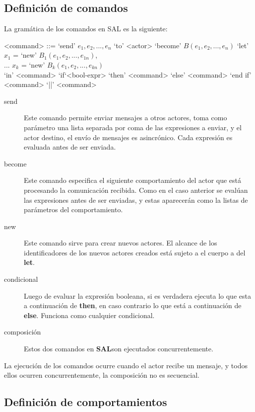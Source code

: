 \documentclass[fleqn]{article}
\newcommand{\SAL}{\textbf{SAL}}
\begin{document}
\subsection{Definición de comandos}
La gramática de los comandos en SAL es la siguiente:

\begin{grammar}
  <command> ::= `send' $e_1, e_2, ..., e_n$ `to' <actor>  
  \alt `become' $B(e_1, e_2, ..., e_n)$
  \alt `let' $x_1$ = `new' $B_1(e_1, e_2, ..., e_{1n})$, \\
   ... $x_k$ = `new' $B_k(e_1, e_2, ..., e_{kn})$       \\
  `in' <command> 
  \alt `if`<bool-expr> `then' <command> `else' <command> `end if'
  \alt <command> `||' <command>
\end{grammar}

\begin{description}
\item [send]  Este comando permite enviar mensajes a otros actores, toma como
  parámetro una lista separada por coma de las expresiones a enviar, y el actor
  destino, el envío de mensajes es asincrónico. Cada expresión es evaluada antes
  de ser enviada.
\item [become] Este comando especifica el siguiente comportamiento del actor
  que está procesando la comunicación recibida. Como en el caso anterior se evalúan
  las expresiones antes de ser enviadas, y estas aparecerán como la listas de
  parámetros del comportamiento. 
\item[new] Este comando sirve para crear nuevos actores. El alcance de los
  identificadores de los nuevos actores creados está sujeto a el cuerpo a del \textbf{let}.
\item[condicional] Luego de evaluar la expresión booleana, si es verdadera
  ejecuta lo que esta a continuación de \textbf{then}, en caso contrario lo que está a
  continuación de \textbf{else}. Funciona como cualquier condicional.
\item[composición] Estos dos comandos en \SAL son ejecutados concurrentemente.
 
\end{description}

La ejecución de los comandos ocurre cuando el actor recibe un mensaje, y todos
ellos ocurren concurrentemente, la composición no es secuencial.

\subsection{Definición de comportamientos}
\end{document}
